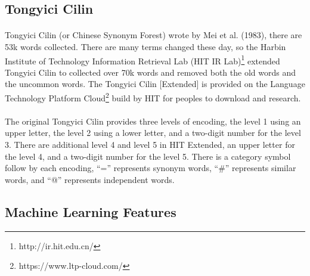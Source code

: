 \documentclass{article}
\begin{document}
\begin{CJK*}{UTF8}{bkai}

\subsection{Tongyici Cilin}
\paragraph{}
Tongyici Cilin (or Chinese Synonym Forest) wrote by Mei et al. (1983)\cite{mei1983hit}, there are 53k words collected. There are many terms changed these day, so the Harbin Institute of Technology Information Retrieval Lab (HIT IR Lab)\footnote{http://ir.hit.edu.cn/} extended Tongyici Cilin to collected over 70k words and removed both the old words and the uncommon words. The Tongyici Cilin [Extended] is provided on the Language Technology Platform Cloud\footnote{https://www.ltp-cloud.com/} build by HIT for peoples to download and research.

\paragraph{}
The original Tongyici Cilin provides three levels of encoding, the level 1 using an upper letter, the level 2 using a lower letter, and a two-digit number for the level 3. There are additional level 4 and level 5 in HIT Extended, an upper letter for the level 4, and a two-digit number for the level 5. There is a category symbol follow by each encoding, ``='' represents synonym words, ``\#'' represents similar words, and ``@'' represents independent words.

\subsection{Machine Learning Features} \label{section:ml_features}

\end{CJK*}
\end{document}
